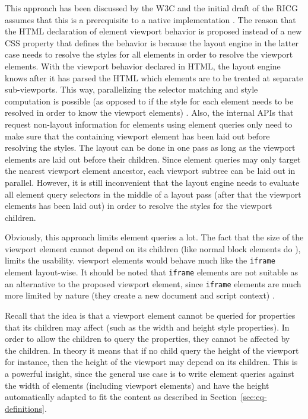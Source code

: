 \documentclass[a4paper,11pt]{kth-mag}
\newcommand{\code}[1]{\texttt{#1}}
\begin{document}
      This approach has been discussed by the \gls{W3C} and the initial draft of the \gls{RICG} assumes that this is a prerequisite to a \gls{native} implementation \cite{w3c_eq_mail,ricg_irc_log}.
      The reason that the \gls{HTML} declaration of element \gls{viewport} behavior is proposed instead of a new \gls{CSS} property that defines the behavior is because the \gls{layout engine} in the latter case needs to resolve the styles for all \glspl{element} in order to resolve the \gls{viewport} \glspl{element}.
      With the \gls{viewport} behavior declared in \gls{HTML}, the \gls{layout engine} knows after it has parsed the \gls{HTML} which \glspl{element} are to be treated at separate sub-\glspl{viewport}.
      This way, parallelizing the selector matching and style computation is possible (as opposed to if the style for each element needs to be resolved in order to know the \gls{viewport} \glspl{element}) \cite{w3c_eq_mail}.
      Also, the internal \glspl{API} that request non-layout information for \glspl{element} using element queries only need to make sure that the containing \gls{viewport} \gls{element} has been laid out before resolving the styles.
      The layout can be done in one pass as long as the \gls{viewport} \glspl{element} are laid out before their children.
      Since element queries may only target the nearest \gls{viewport} \gls{element} ancestor, each \gls{viewport} subtree can be laid out in parallel.
      However, it is still inconvenient that the \gls{layout engine} needs to evaluate all element query selectors in the middle of a layout pass (after that the \gls{viewport} \glspl{element} has been laid out) in order to resolve the styles for the \gls{viewport} children.

      Obviously, this approach limits element queries a lot.
      The fact that the size of the \gls{viewport} \gls{element} cannot depend on its children (like normal block \glspl{element} do \cite{w3c_css21}), limits the usability.
      \Gls{viewport} \glspl{element} would behave much like the \code{iframe} \gls{element} layout-wise.
      It should be noted that \code{iframe} \glspl{element} are not suitable as an alternative to the proposed \gls{viewport} \gls{element}, since \code{iframe} \glspl{element} are much more limited by nature (they create a new \gls{document} and script context) \cite{w3c_css21}.

      Recall that the idea is that a \gls{viewport} element cannot be queried for properties that its children may affect (such as the width and height style properties).
      In order to allow the children to query the properties, they cannot be affected by the children.
      In theory it means that if no child query the height of the \gls{viewport} for instance, then the height of the \gls{viewport} may depend on its children.
      This is a powerful insight, since the general use case is to write element queries against the width of \glspl{element} (including \gls{viewport} \glspl{element}) and have the height automatically adapted to fit the content as described in Section~\ref{sec:eq-definitions}.
\end{document}
